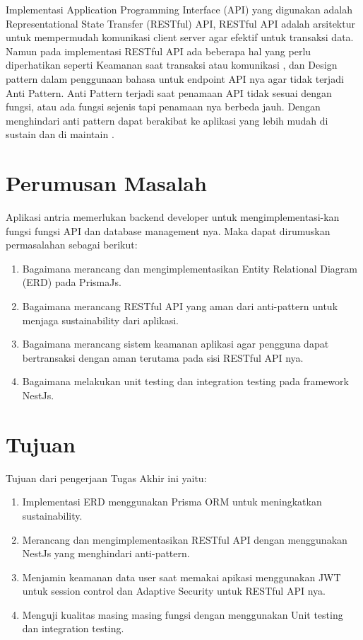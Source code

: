 Implementasi Application Programming Interface (API) yang digunakan adalah Representational State Transfer (RESTful) API, RESTful API adalah arsitektur untuk mempermudah komunikasi client server agar efektif untuk transaksi data.%
Namun pada implementasi RESTful API ada beberapa hal yang perlu diperhatikan seperti Keamanan saat transaksi  atau komunikasi \cite{Beer2018}, dan Design pattern dalam penggunaan bahasa untuk endpoint API nya agar tidak terjadi Anti Pattern. Anti Pattern terjadi saat penamaan API tidak sesuai dengan fungsi, atau ada fungsi sejenis tapi penamaan nya berbeda jauh. Dengan menghindari anti pattern dapat berakibat ke aplikasi yang lebih mudah di sustain dan di maintain \cite{Aghajani2018} \cite{Alshraiedeh2021}.

\section{Perumusan Masalah}
Aplikasi antria memerlukan backend developer untuk mengimplementasi-kan fungsi fungsi API dan database management nya. Maka dapat dirumuskan permasalahan sebagai berikut:
\begin{enumerate}
  \item Bagaimana merancang dan mengimplementasikan Entity Relational Diagram (ERD) pada PrismaJs.
  \item Bagaimana merancang RESTful API yang aman dari anti-pattern untuk menjaga sustainability dari aplikasi.
  \item Bagaimana merancang sistem keamanan aplikasi agar pengguna dapat bertransaksi dengan aman terutama pada sisi RESTful API nya.
  \item Bagaimana melakukan unit testing dan integration testing pada framework NestJs.
\end{enumerate}


\section{Tujuan}
Tujuan dari pengerjaan Tugas Akhir ini yaitu:
\begin{enumerate}
  \item Implementasi ERD menggunakan Prisma ORM untuk meningkatkan sustainability.
  \item Merancang dan mengimplementasikan RESTful API dengan menggunakan NestJs yang menghindari anti-pattern.
  \item Menjamin keamanan data user saat memakai apikasi menggunakan JWT untuk session control dan Adaptive Security untuk RESTful API nya.
  \item Menguji kualitas masing masing fungsi dengan menggunakan Unit testing dan integration testing.
\end{enumerate}

